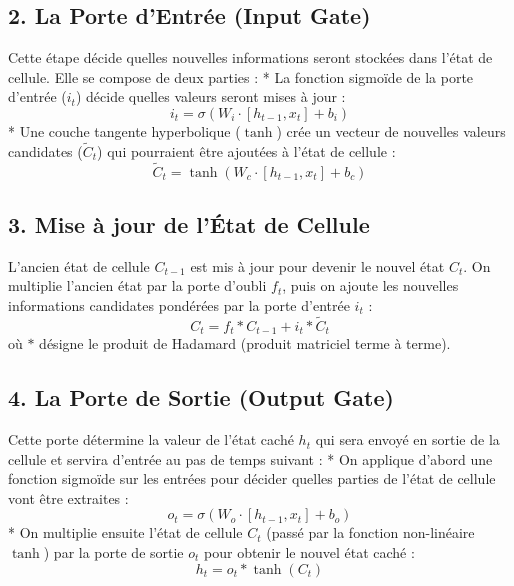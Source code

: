 \subsection{2. La Porte d'Entrée (Input Gate)}
Cette étape décide quelles nouvelles informations seront stockées dans l'état de cellule. Elle se compose de deux parties :
* La fonction sigmoïde de la porte d'entrée ($i_t$) décide quelles valeurs seront mises à jour :
\begin{equation}
    i_t = \sigma(W_i \cdot [h_{t-1}, x_t] + b_i)
\end{equation}
* Une couche tangente hyperbolique ($\tanh$) crée un vecteur de nouvelles valeurs candidates ($\tilde{C}_t$) qui pourraient être ajoutées à l'état de cellule :
\begin{equation}
    \tilde{C}_t = \tanh(W_c \cdot [h_{t-1}, x_t] + b_c)
\end{equation}

\subsection{3. Mise à jour de l'État de Cellule}
L'ancien état de cellule $C_{t-1}$ est mis à jour pour devenir le nouvel état $C_t$. On multiplie l'ancien état par la porte d'oubli $f_t$, puis on ajoute les nouvelles informations candidates pondérées par la porte d'entrée $i_t$ :
\begin{equation}
    C_t = f_t * C_{t-1} + i_t * \tilde{C}_t
\end{equation}
où $*$ désigne le produit de Hadamard (produit matriciel terme à terme).

\subsection{4. La Porte de Sortie (Output Gate)}
Cette porte détermine la valeur de l'état caché $h_t$ qui sera envoyé en sortie de la cellule et servira d'entrée au pas de temps suivant :
* On applique d'abord une fonction sigmoïde sur les entrées pour décider quelles parties de l'état de cellule vont être extraites :
\begin{equation}
    o_t = \sigma(W_o \cdot [h_{t-1}, x_t] + b_o)
\end{equation}
* On multiplie ensuite l'état de cellule $C_t$ (passé par la fonction non-linéaire $\tanh$) par la porte de sortie $o_t$ pour obtenir le nouvel état caché :
\begin{equation}
    h_t = o_t * \tanh(C_t)
\end{equation}

